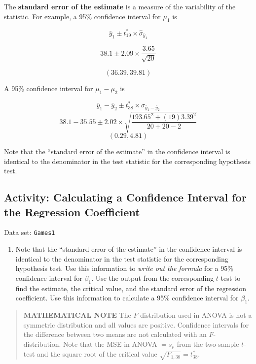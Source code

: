 \documentclass[
]{book}
\providecommand{\tightlist}{%
  \setlength{\itemsep}{0pt}\setlength{\parskip}{0pt}}
\begin{document}
The \textbf{standard error of the estimate} is a measure of the variability of the statistic. For example, a 95\% confidence interval for \(\mu_1\) is

\[
\bar{y}_1 \pm t^*_{19} \times \hat{\sigma}_{\bar{y}_1}
\]

\[
38.1 \pm 2.09 \times \frac{3.65}{\sqrt{20}}
\]

\[
(36.39, 39.81)
\]

A 95\% confidence interval for \(\mu_1 - \mu_2\) is

\[
\bar{y}_1 - \bar{y}_2 \pm t^*_{38} \times \hat{\sigma}_{\bar{y}_1 - \bar{y}_2}
\]
\[
38.1 - 35.55 \pm 2.02 \times \sqrt{ \frac{193.65^2 + (19)3.39^2}{20 + 20 - 2} }
\]
\[
(0.29, 4.81)
\]

Note that the ``standard error of the estimate'' in the confidence interval is identical to the denominator in the test statistic for the corresponding hypothesis test.

\hypertarget{activity-calculating-a-confidence-interval-for-the-regression-coefficient}{%
\subsection*{Activity: Calculating a Confidence Interval for the Regression Coefficient}\label{activity-calculating-a-confidence-interval-for-the-regression-coefficient}}

Data set: \texttt{Games1}

\begin{enumerate}
\def\labelenumi{\arabic{enumi}.}
\setcounter{enumi}{39}
\tightlist
\item
  Note that the ``standard error of the estimate'' in the confidence interval is identical to the denominator in the test statistic for the corresponding hypothesis test. Use this information to \emph{write out the formula} for a 95\% confidence interval for \(\beta_1\). Use the output from the corresponding \(t\)-test to find the estimate, the critical value, and the standard error of the regression coefficient. Use this information to calculate a 95\% confidence interval for \(\beta_1\).
\end{enumerate}

\begin{quote}
\textbf{MATHEMATICAL NOTE} The \(F\)-distribution used in ANOVA is not a symmetric distribution and all values are positive. Confidence intervals for the difference between two means are not calculated with an \(F\)-distribution. Note that the MSE in ANOVA \(= s_p\) from the two-sample \(t\)-test and the square root of the critical value \(\sqrt{F_{1,38}} = t^*_{38}\).
\end{quote}
\end{document}
